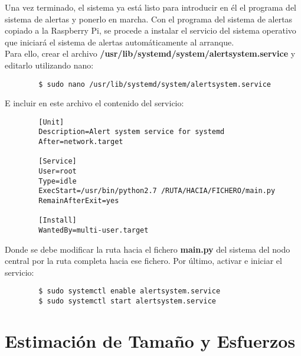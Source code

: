     Una vez terminado, el sistema ya está listo para introducir en él el programa del sistema de alertas y ponerlo en marcha. Con el programa del sistema de alertas copiado a la Raspberry Pi, se procede a instalar el servicio del sistema operativo que iniciará el sistema de alertas automáticamente al arranque. \\
    
    Para ello, crear el archivo \textbf{/usr/lib/systemd/system/alertsystem.service} y editarlo utilizando nano:
    
    \begin{verbatim}
        $ sudo nano /usr/lib/systemd/system/alertsystem.service
    \end{verbatim}
    
    E incluir en este archivo el contenido del servicio:
    
    \begin{verbatim}
        [Unit]
        Description=Alert system service for systemd
        After=network.target
        
        [Service]
        User=root
        Type=idle
        ExecStart=/usr/bin/python2.7 /RUTA/HACIA/FICHERO/main.py
        RemainAfterExit=yes
        
        [Install]
        WantedBy=multi-user.target
    \end{verbatim}
    
    Donde se debe modificar la ruta hacia el fichero \textbf{main.py} del sistema del nodo central por la ruta completa hacia ese fichero. Por último, activar e iniciar el servicio:
    
    \begin{verbatim}
        $ sudo systemctl enable alertsystem.service
        $ sudo systemctl start alertsystem.service
    \end{verbatim}
    
\clearpage
\chapter{Estimación de Tamaño y Esfuerzos}

